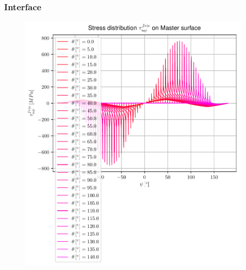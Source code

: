\documentclass[first,firstsupp,lastsupp,handout,last,hyperref,table]{ETHclass}
\begin{document}
\begin{frame}
\frametitle{\vspace{0.35cm}\scriptsize Interface}
\vspace{-0.85cm}
\begin{figure}
\includegraphics[height=0.9\textheight]{2017-03-03_AbqRunSummary_AllFricShearOnMaster.pdf}
\end{figure}
\end{frame}
\end{document}
